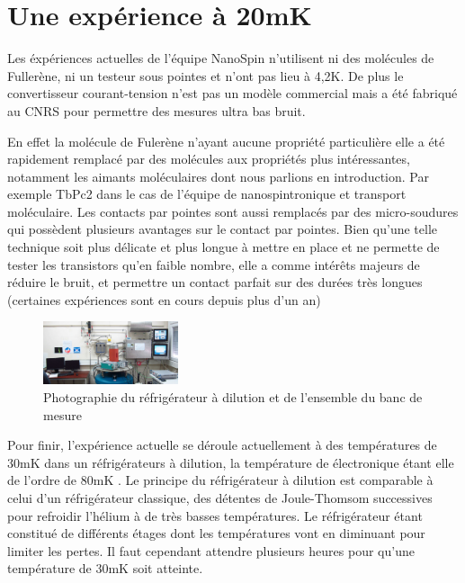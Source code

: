 \section{Une expérience à 20mK}
Les éxpériences actuelles de l'équipe NanoSpin n'utilisent ni des molécules de Fullerène, ni un testeur sous pointes et n'ont pas lieu à 4,2K. De plus le convertisseur courant-tension n'est pas un modèle commercial mais a été fabriqué au CNRS pour permettre des mesures ultra bas bruit.

En effet la molécule de Fulerène n'ayant aucune propriété particulière elle a été rapidement remplacé par des molécules aux propriétés plus intéressantes, notamment les aimants moléculaires dont nous parlions en introduction. Par exemple TbPc2 dans le cas de l'équipe de nanospintronique et transport moléculaire.
Les contacts par pointes sont aussi remplacés par des micro-soudures qui possèdent plusieurs avantages sur le contact par pointes. Bien qu'une telle technique soit plus délicate et plus longue à mettre en place et ne permette de tester les transistors qu'en faible nombre, elle a comme intérêts majeurs de réduire le bruit, et permettre un contact parfait sur des durées très longues (certaines expériences sont en cours depuis plus d'un an)

\begin{figure}[h]
    \begin{center}
        \includegraphics[width=150px]{Photos/Refrigerateur_Dillution.png}
        \caption{Photographie du réfrigérateur à dilution et de l'ensemble du banc de mesure}
        \label{fig:}
    \end{center}
\end{figure}

Pour finir, l'expérience actuelle se déroule actuellement à des températures de 30mK dans un réfrigérateurs à dilution, la température de électronique étant elle de l'ordre de 80mK \cite{10}. Le principe du réfrigérateur à dilution est comparable à celui d'un réfrigérateur classique, des détentes de Joule-Thomsom successives pour refroidir l'hélium à de très basses températures. Le réfrigérateur étant constitué de différents étages dont les températures vont en diminuant pour limiter les pertes. Il faut cependant attendre plusieurs heures pour qu'une température de 30mK soit atteinte.
